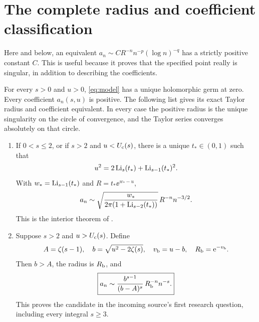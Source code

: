 \section{The complete radius and coefficient classification}
\label{sec:phase}

Here and below, an equivalent $a_n\sim C R^{-n}n^{-p}(\log n)^{-q}$
has a strictly positive constant $C$.  This is useful because it proves
that the specified point really is singular, in addition to describing
the coefficients.

\begin{theorem}\label{thm:phase}
For every $s>0$ and $u>0$, \eqref{eq:model} has a unique holomorphic germ
at zero.  Every coefficient $a_n(s,u)$ is positive.  The following list
gives its exact Taylor radius and coefficient equivalent.  In every
case the positive radius is the unique singularity on the circle of
convergence, and the Taylor series converges absolutely on that circle.

\begin{enumerate}
\item If $0<s\le2$, or if $s>2$ and $u<U_{\mathrm c}(s)$, there is a unique
$t_*\in(0,1)$ such that
\begin{equation}\label{eq:characteristic}
 u^2=2\operatorname{Li}_s(t_*)+\operatorname{Li}_{s-1}(t_*)^2.
\end{equation}
With $w_* =\operatorname{Li}_{s-1}(t_*)$ and $R=t_*\ee^{w_*-u}$,
\begin{equation}\label{eq:interior-law}
 a_n\sim
 \sqrt{\frac{w_*}{2\pi(1+\operatorname{Li}_{s-2}(t_*))}}\,
 R^{-n}n^{-3/2}.
\end{equation}
This is the interior theorem of \cite{RepoFeedback}.

\item Suppose $s>2$ and $u>U_{\mathrm c}(s)$.  Define
\begin{equation}\label{eq:boundary-parameters}
 A=\zeta(s-1),\quad b=\sqrt{u^2-2\zeta(s)},\quad
 v_{\mathrm b}=u-b,\quad R_{\mathrm b}=\mathrm e^{-v_{\mathrm b}}.
\end{equation}
Then $b>A$, the radius is $R_{\mathrm b}$, and
\begin{equation}\label{eq:supercritical-law}
 \boxed{\displaystyle
 a_n\sim \frac{b^{s-1}}{(b-A)^s}\,R_{\mathrm b}^{-n}n^{-s}.}
\end{equation}
This proves the candidate in the incoming source's first research
question, including every integral $s\ge3$.


\end{enumerate}
\end{theorem}
